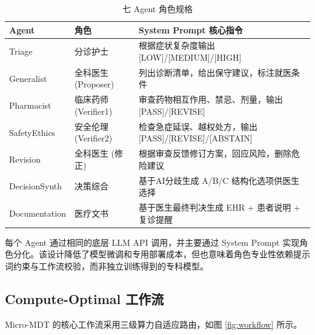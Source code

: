 \documentclass[11pt,a4paper]{ctexart}
\begin{document}
\begin{table}[H]
\centering
\caption{七 Agent 角色规格}
\label{tab:agents}
\small
\begin{tabularx}{\textwidth}{l|l|X}
\toprule
\textbf{Agent} & \textbf{角色} & \textbf{System Prompt 核心指令} \\
\midrule
Triage & 分诊护士 & 根据症状复杂度输出 [LOW]/[MEDIUM]/[HIGH] \\
Generalist & 全科医生 (Proposer) & 列出诊断清单，给出保守建议，标注就医条件 \\
Pharmacist & 临床药师 (Verifier1) & 审查药物相互作用、禁忌、剂量，输出 [PASS]/[REVISE] \\
SafetyEthics & 安全伦理 (Verifier2) & 检查急症延误、越权处方，输出 [PASS]/[REVISE]/[ABSTAIN] \\
Revision & 全科医生 (修正) & 根据审查反馈修订方案，回应风险，删除危险建议 \\
DecisionSynth & 决策综合 & 基于AI分歧生成 A/B/C 结构化选项供医生选择 \\
Documentation & 医疗文书 & 基于医生最终判决生成 EHR + 患者说明 + 复诊提醒 \\
\bottomrule
\end{tabularx}
\end{table}

每个 Agent 通过相同的底层 LLM API 调用，并主要通过 System Prompt 实现角色分化。该设计降低了模型微调和专用部署成本，但也意味着角色专业性依赖提示词约束与工作流校验，而非独立训练得到的专科模型。

\subsection{Compute-Optimal 工作流}

Micro-MDT 的核心工作流采用三级算力自适应路由，如图 \ref{fig:workflow} 所示。
\end{document}
